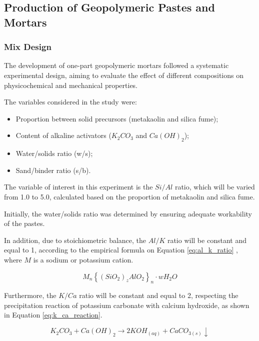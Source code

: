 \subsection{Production of Geopolymeric Pastes and Mortars}
\label{sec:production_geopolymeric_pastes_mortars}

\subsubsection{Mix Design}
\label{sec:mix_design}

The development of one-part geopolymeric mortars followed a systematic experimental design, aiming to evaluate the effect of different compositions on physicochemical and mechanical properties.

The variables considered in the study were:

\begin{itemize}
    \item Proportion between solid precursors (metakaolin and silica fume);
    \item Content of alkaline activators ($K_2CO_3$ and $Ca(OH)_2$);
    \item Water/solids ratio (w/s);
    \item Sand/binder ratio (s/b).
\end{itemize}

The variable of interest in this experiment is the $Si/Al$ ratio, which will be varied from 1.0 to 5.0, calculated based on the proportion of metakaolin and silica fume.

Initially, the water/solids ratio was determined %
by ensuring adequate workability of the pastes.

In addition, due to stoichiometric balance, the $Al/K$ ratio will be constant and equal to 1, according to the empirical formula on Equation \ref{eq:al_k_ratio} \cite{joseph1991geopolymers}, where $M$ is a sodium or potassium cation.

\begin{equation}
    \label{eq:al_k_ratio}
    M_n \left\{ \left(SiO_2 \right)_z AlO_2 \right\}_n \cdot wH_2O
\end{equation}

Furthermore, the $K/Ca$ ratio will be constant and equal to 2, respecting the precipitation reaction of potassium carbonate with calcium hydroxide, as shown in Equation \ref{eq:k_ca_reaction}.

\begin{equation}
    \label{eq:k_ca_reaction}
    K_2CO_3 + Ca(OH)_2 \rightarrow  2KOH_{(aq)} + CaCO_{3(s)} \downarrow
\end{equation}

